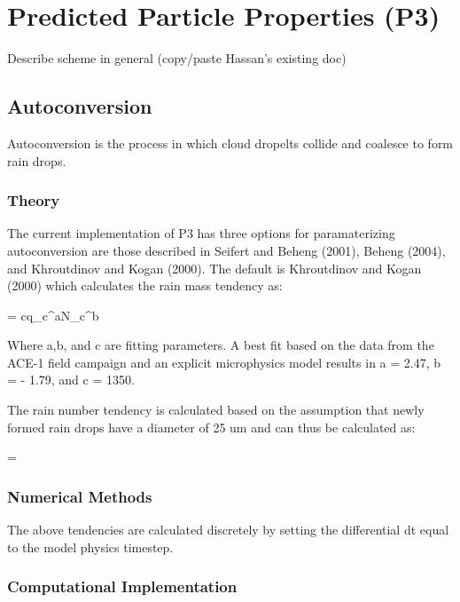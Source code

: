 \section{Predicted Particle Properties (P3)}

Describe scheme in general (copy/paste Hassan's existing doc)

\subsection{Autoconversion}

Autoconversion is the process in which cloud dropelts collide and coalesce to form rain drops. 

\subsubsection{Theory}

The current implementation of P3 has three options for paramaterizing autoconversion are those described 
in Seifert and Beheng (2001), Beheng (2004), and Khroutdinov and Kogan (2000). The default is 
Khroutdinov and Kogan (2000) which calculates the rain mass tendency as: 

 = cq_{c}^{a}N_{c}^{b}

Where a,b, and c are fitting parameters. A best fit based on the data from the ACE-1 field 
campaign and an explicit microphysics model results in a = 2.47, b = - 1.79, and c = 1350.

The rain number tendency is calculated based on the assumption that newly formed rain drops 
have a diameter of 25 um and can thus be calculated as:

 = 

\subsubsection{Numerical Methods}

The above tendencies are calculated discretely by setting the differential dt equal to the model physics timestep.

\subsubsection{Computational Implementation}

